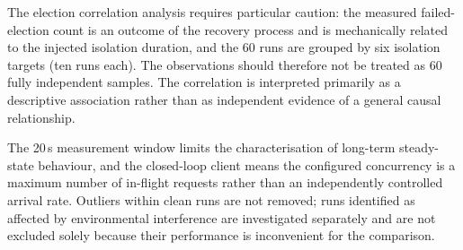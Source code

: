 The election correlation analysis requires particular caution: the measured
failed-election count is an outcome of the recovery process and is
mechanically related to the injected isolation duration, and the 60 runs
are grouped by six isolation targets (ten runs each). The observations
should therefore not be treated as 60 fully independent samples. The
correlation is interpreted primarily as a descriptive association rather
than as independent evidence of a general causal relationship.

The 20\,s measurement window limits the characterisation of long-term
steady-state behaviour, and the closed-loop client means the configured
concurrency is a maximum number of in-flight requests rather than an
independently controlled arrival rate. Outliers within clean runs are not
removed; runs identified as affected by environmental interference are
investigated separately and are not excluded solely because their
performance is inconvenient for the comparison.
